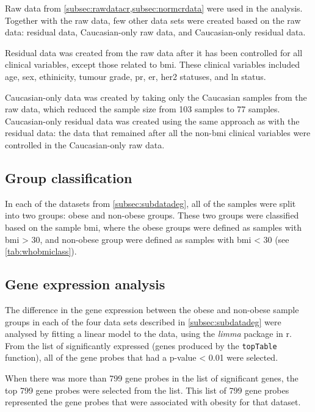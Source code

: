 Raw data from \cref{subsec:rawdatacr,subsec:normcrdata} were used in the analysis.
Together with the raw data, few other data sets were created based on the raw data: residual data, Caucasian-only raw data, and Caucasian-only residual data.

Residual data was created from the raw data after it has been controlled for all clinical variables, except those related to \gls{bmi}.
These clinical variables included age, sex, ethinicity, tumour grade, \gls{pr}, \gls{er}, \gls{her2} statuses, and \gls{ln} status.

Caucasian-only data was created by taking only the Caucasian samples from the raw data, which reduced the sample size from 103 samples to 77 samples.
Caucasian-only residual data was created using the same approach as with the residual data: the data that remained after all the non-\gls{bmi} clinical variables were controlled in the Caucasian-only raw data.

\subsection{Group classification}
\label{subsec:crdegclass}

In each of the datasets from \cref{subsec:subdatadeg}, all of the samples were split into two groups: obese and non-obese groups.
These two groups were classified based on the sample \gls{bmi}, where the obese groups were defined as samples with \gls{bmi}  \textgreater{} 30, and non-obese group were defined as samples with \gls{bmi}  \textless{} 30 (see \cref{tab:whobmiclass}).

\subsection{Gene expression analysis}
\label{subsec:crdeg}

The difference in the gene expression between the obese and non-obese sample groups in each of the four data sets described in \cref{subsec:subdatadeg} were analysed by fitting a linear model to the data, using the \textit{limma} package in \gls{r}.
From the list of significantly expressed (genes produced by the \texttt{topTable} function), all of the gene probes that had a p-value \textless{} 0.01 were selected.

When there was more than 799 gene probes in the list of significant genes, the top 799 gene probes were selected from the list.
This list of 799 gene probes represented the gene probes that were associated with obesity  for that dataset.

